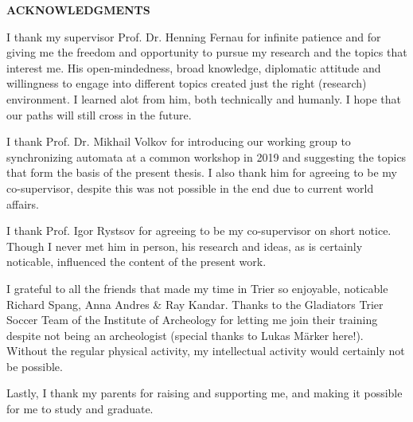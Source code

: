 \begin{center} \large
	\textbf{ACKNOWLEDGMENTS}
\end{center}


\bigskip 

\begin{center}
\begin{minipage}{0.7\textwidth}

I thank my supervisor Prof. Dr. Henning Fernau for infinite patience and for giving me
the freedom and opportunity to pursue my research and the topics that interest me.
His open-mindedness, broad knowledge, diplomatic attitude and willingness to engage into different topics
created just the right (research) environment. I learned alot from him, both technically and humanly.
I hope that our paths will still cross in the future.

\medskip 

I thank Prof. Dr. Mikhail Volkov for introducing our working group to synchronizing automata at a common workshop in 2019
and suggesting the topics that form the basis
of the present thesis. I also thank him for agreeing to be my co-supervisor, despite this
was not possible in the end due to current world affairs. %

\medskip 

I thank Prof. Igor Rystsov for agreeing to be my co-supervisor on short notice.
Though I never met him in person, his research and ideas, as is certainly noticable,
influenced the content of the present work.

\medskip 

I grateful to all the friends that made my time in Trier so enjoyable,
noticable Richard Spang, Anna Andres \& Ray Kandar. 
Thanks to the Gladiators Trier Soccer Team of the Institute of Archeology for letting me 
join their training despite not being an archeologist (special thanks to Lukas Märker here!). 
Without the regular physical activity, my intellectual activity would certainly not be possible.

%
\medskip 

Lastly, I thank my parents for raising and supporting me, and making it possible for me to study and graduate.


\end{minipage} 
\end{center}